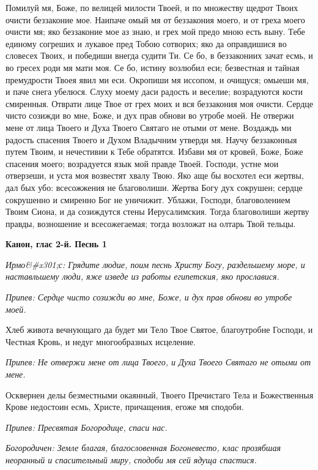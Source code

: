 Помилуй мя, Боже, по велицей милости Твоей, и по множеству щедрот Твоих очисти беззаконие мое. Наипаче омый мя от беззакония моего, и от греха моего очисти мя; яко беззаконие мое аз знаю, и грех мой предо мною есть выну. Тебе единому согреших и лукавое пред Тобою сотворих; яко да оправдишися во словесех Твоих, и победиши внегда судити Ти. Се бо, в беззакониих зачат есмь, и во гресех роди мя мати моя. Се бо, истину возлюбил еси; безвестная и тайная премудрости Твоея явил ми еси. Окропиши мя иссопом, и очищуся; омыеши мя, и паче снега убелюся. Слуху моему даси радость и веселие; возрадуются кости смиренныя. Отврати лице Твое от грех моих и вся беззакония моя очисти. Сердце чисто созижди во мне, Боже, и дух прав обнови во утробе моей. Не отвержи мене от лица Твоего и Духа Твоего Святаго не отыми от мене. Воздаждь ми радость спасения Твоего и Духом Владычним утверди мя. Научу беззаконныя путем Твоим, и нечестивии к Тебе обратятся. Избави мя от кровей, Боже, Боже спасения моего; возрадуется язык мой правде Твоей. Господи, устне мои отверзеши, и уста моя возвестят хвалу Твою. Яко аще бы восхотел еси жертвы, дал бых убо: всесожжения не благоволиши. Жертва Богу дух сокрушен; сердце сокрушенно и смиренно Бог не уничижит. Ублажи, Господи, благоволением Твоим Сиона, и да созиждутся стены Иерусалимския. Тогда благоволиши жертву правды, возношение и всесожегаемая; тогда возложат на олтарь Твой тельцы.




\bfseries Канон, глас 2-й. Песнь 1\normalfont{}


\itshape Ирмо&#x301;с:\normalfont{} Грядите людие, поим песнь Христу Богу, раздельшему море, и наставльшему люди, яже изведе из работы египетския, яко прославися.


\itshape Припев: \normalfont{}Сердце чисто созижди во мне, Боже, и дух прав обнови во утробе моей.


Хлеб живота вечнующаго да будет ми Тело Твое Святое, благоутробне Господи, и Честная Кровь, и недуг многообразных исцеление.


\itshape Припев: \normalfont{}Не отвержи мене от лица Твоего, и Духа Твоего Святаго не отыми от мене.


Осквернен делы безместными окаянный, Твоего Пречистаго Тела и Божественныя Крове недостоин есмь, Христе, причащения, егоже мя сподоби.


\itshape Припев: \normalfont{}Пресвятая Богородице, спаси нас.


\itshape Богородичен: \normalfont{}Земле благая, благословенная Богоневесто, клас прозябшая неоранный и спасительный миру, сподоби мя сей ядуща спастися.




